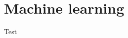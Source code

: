 \documentclass[introduction.tex]{subfiles}
\begin{document}
\section{Machine learning}

Test
\end{document}
